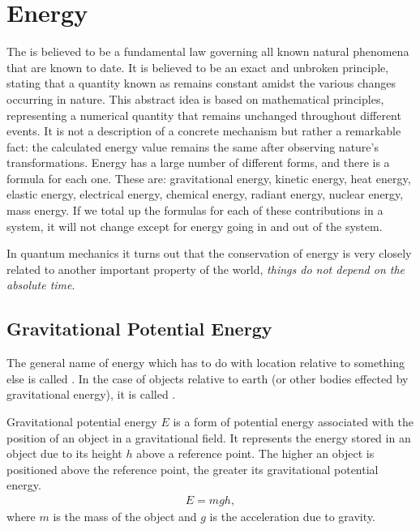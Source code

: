 \section{Energy}

The  is believed to be a fundamental law governing all known natural phenomena that are known to date. It is believed to be an exact and unbroken principle, stating that a quantity known as  remains constant amidst the various changes occurring in nature. This abstract idea is based on mathematical principles, representing a numerical quantity that remains unchanged throughout different events. It is not a description of a concrete mechanism but rather a remarkable fact: the calculated energy value remains the same after observing nature's transformations. Energy has a large number of different forms, and there is a formula for each one. These are: gravitational energy, kinetic energy, heat energy, elastic energy, electrical energy, chemical energy, radiant energy, nuclear energy, mass energy. If we total up the formulas for each of these contributions in a system, it will not change except for energy going in and out of the system.

In quantum mechanics it turns out that the conservation of energy is very closely related to another important property of the world, \textit{things do not depend on the absolute time}.

\subsection{Gravitational Potential Energy}

The general name of energy which has to do with location relative to something else is called . In the case of objects relative to earth (or other bodies effected by gravitational energy), it is called .
	
\begin{defn}
	Gravitational potential energy $E$ is a form of potential energy associated with the position of an object in a gravitational field. It represents the energy stored in an object due to its height $h$ above a reference point. The higher an object is positioned above the reference point, the greater its gravitational potential energy.
	\begin{align}
		E = mgh,
	\end{align}
	where $m$ is the mass of the object and $g$ is the acceleration due to gravity.
\end{defn}

